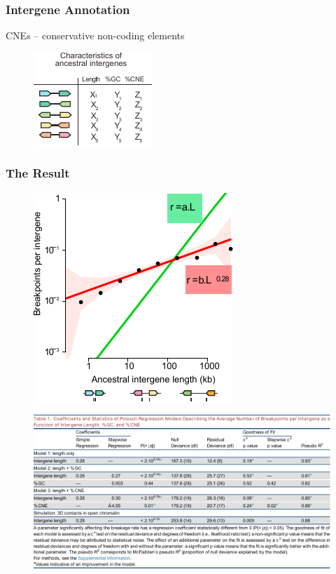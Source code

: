 \documentclass[svgnames,14pt]{beamer}
\begin{document}
\begin{frame}
\frametitle{Intergene Annotation}
CNEs -- conservative non-coding elements
\begin{figure}
	\centering
	\includegraphics[scale = 2.50]{Annotation.pdf}
\end{figure}
\end{frame}

\begin{frame}
\frametitle{The Result}
\begin{figure}
	\centering
	\includegraphics[scale = 1.5]{Plot.pdf}
\end{figure}
\end{frame}

\begin{frame}
\begin{figure}
	\centering
	\includegraphics[scale = .67]{Table11.pdf}
\end{figure}
\end{frame}
\end{document}
